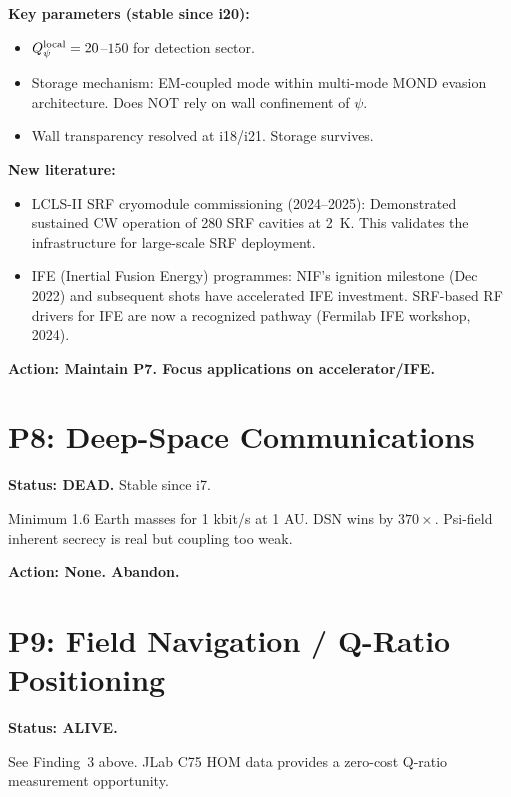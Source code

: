 \documentclass[11pt]{article}
\begin{document}
\textbf{Key parameters (stable since i20):}
\begin{itemize}
\item $Q_\psi^{\rm local} = 20$--$150$ for detection sector.
\item Storage mechanism: EM-coupled mode within multi-mode MOND evasion
  architecture.  Does NOT rely on wall confinement of $\psi$.
\item Wall transparency resolved at i18/i21.  Storage survives.
\end{itemize}

\textbf{New literature:}
\begin{itemize}
\item LCLS-II SRF cryomodule commissioning (2024--2025): Demonstrated
  sustained CW operation of 280 SRF cavities at 2~K.  This validates
  the infrastructure for large-scale SRF deployment.
\item IFE (Inertial Fusion Energy) programmes: NIF's ignition milestone
  (Dec 2022) and subsequent shots have accelerated IFE investment.
  SRF-based RF drivers for IFE are now a recognized pathway
  (Fermilab IFE workshop, 2024).
\end{itemize}

\textbf{Action: Maintain P7.  Focus applications on accelerator/IFE.}


\section{P8: Deep-Space Communications}

\textbf{Status: DEAD.}  Stable since i7.

Minimum 1.6 Earth masses for 1 kbit/s at 1 AU.  DSN wins by $370\times$.
Psi-field inherent secrecy is real but coupling too weak.

\textbf{Action: None.  Abandon.}


\section{P9: Field Navigation / Q-Ratio Positioning}

\textbf{Status: ALIVE.}

See Finding~3 above.  JLab C75 HOM data provides a zero-cost Q-ratio
measurement opportunity.
\end{document}
